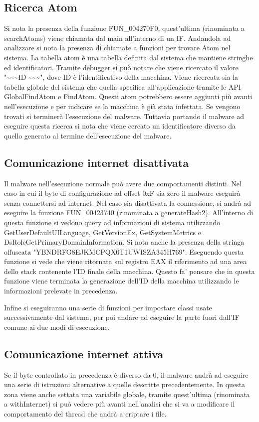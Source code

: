 \documentclass[a4paper,12pt]{article}
\begin{document}
\subsection{Ricerca Atom}
Si nota la presenza della funzione FUN\_004270F0, quest'ultima (rinominata a searchAtoms) viene chiamata dal main all'interno di un IF. Andandola ad analizzare si nota la presenza di chiamate a funzioni per trovare Atom nel sistema. La tabella atom è una tabella definita dal sistema che mantiene stringhe ed identificatori. Tramite debugger si può notare che viene ricercato il valore "\textasciitilde\textasciitilde\textasciitilde ID \textasciitilde\textasciitilde\textasciitilde", dove ID è l'identificativo della macchina. Viene ricercata sia la tabella globale del sistema che quella specifica all'applicazione tramite le API GlobalFindAtom e FindAtom. 
Questi atom potrebbero essere aggiunti più avanti nell'esecuzione e per indicare se la macchina è già stata infettata. Se vengono trovati si terminerà l'esecuzione del malware. Tuttavia portando il malware ad eseguire questa ricerca si nota che viene cercato un identificatore diverso da quello generato al termine dell'esecuzione del malware.


\subsection{Comunicazione internet disattivata}
Il malware nell'esecuzione normale può avere due comportamenti distinti. Nel caso in cui il byte di configurazione ad offset 0xF sia zero il malware eseguirà senza connettersi ad internet. 
Nel caso sia disattivata la connessione, si andrà ad eseguire la funzione FUN\_00423740 (rinominata a generateHash2). All'interno di questa funzione si vedono query ad informazioni di sistema utilizzando GetUserDefaultUILanguage, GetVersionEx, GetSystemMetrics e DsRoleGetPrimaryDomainInformation. Si nota anche la presenza della stringa offuscata "YBNDRFG8EJKMCPQX0T1UWISZA345H769". Eseguendo questa funzione si vede che viene ritornata sul registro EAX il riferimento ad una area dello stack contenente l'ID finale della macchina. Questo fa' pensare che in questa funzione viene terminata la generazione dell'ID della macchina utilizzando le informazioni prelevate in precedenza.

Infine si eseguiranno una serie di funzioni per impostare classi usate successivamente dal sistema, per poi andare ad eseguire la parte fuori dall'IF comune ai due modi di esecuzione.  

\subsection{Comunicazione internet attiva}
Se il byte controllato in precedenza è diverso da 0, il malware andrà ad eseguire una serie di istruzioni alternative a quelle descritte precedentemente.  In questa zona viene anche settata una variabile globale, tramite quest'ultima (rinominata a withInternet) si può vedere più avanti nell'analisi che si va a modificare il comportamento del thread che andrà a criptare i file. 
\end{document}
